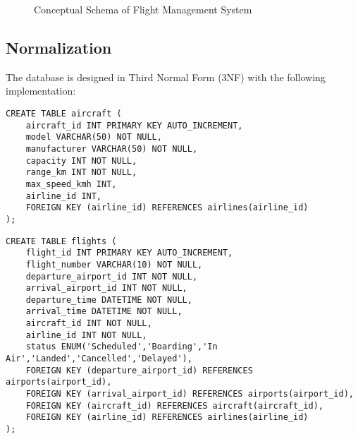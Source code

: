 \documentclass[a4paper,12pt]{article}
\begin{document}
\begin{figure}[h]
\caption{Conceptual Schema of Flight Management System}
\label{fig:schema}
\end{figure}

\subsection{Normalization}
The database is designed in Third Normal Form (3NF) with the following implementation:

\begin{lstlisting}[caption=Example of 1NF Implementation]
CREATE TABLE aircraft (
    aircraft_id INT PRIMARY KEY AUTO_INCREMENT,
    model VARCHAR(50) NOT NULL,
    manufacturer VARCHAR(50) NOT NULL,
    capacity INT NOT NULL,
    range_km INT NOT NULL,
    max_speed_kmh INT,
    airline_id INT,
    FOREIGN KEY (airline_id) REFERENCES airlines(airline_id)
);
\end{lstlisting}

\begin{lstlisting}[caption=Example of 2NF Implementation]
CREATE TABLE flights (
    flight_id INT PRIMARY KEY AUTO_INCREMENT,
    flight_number VARCHAR(10) NOT NULL,
    departure_airport_id INT NOT NULL,
    arrival_airport_id INT NOT NULL,
    departure_time DATETIME NOT NULL,
    arrival_time DATETIME NOT NULL,
    aircraft_id INT NOT NULL,
    airline_id INT NOT NULL,
    status ENUM('Scheduled','Boarding','In Air','Landed','Cancelled','Delayed'),
    FOREIGN KEY (departure_airport_id) REFERENCES airports(airport_id),
    FOREIGN KEY (arrival_airport_id) REFERENCES airports(airport_id),
    FOREIGN KEY (aircraft_id) REFERENCES aircraft(aircraft_id),
    FOREIGN KEY (airline_id) REFERENCES airlines(airline_id)
);
\end{lstlisting}
\end{document}
